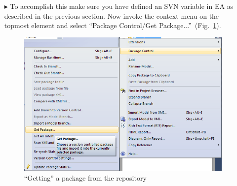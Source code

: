 \begin{enumerate}
\item[$\blacktriangleright$] To accomplish this make sure you have defined an SVN variable in EA as described in the previous section. 
Now invoke the context menu on the topmost element and select ``Package Control/Get Package...''~(Fig.~\ref{fig:advanced-topics-eaSVN-getpackage}).
\begin{figure}[htbp]
\begin{center}
	\includegraphics[height=0.4\textheight]{pics/advancedTopics/eaSVN/DemoLanguages/004.png}
	\caption{``Getting'' a package from the repository}
  	\label{fig:advanced-topics-eaSVN-getpackage}
\end{center}
\end{figure}


\end{enumerate}
